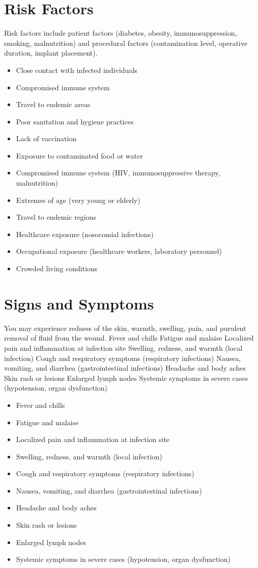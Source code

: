 \section{Risk Factors}
Risk factors include patient factors (diabetes, obesity, immunosuppression, smoking, malnutrition) and procedural factors (contamination level, operative duration, implant placement).

\begin{itemize}[noitemsep]
  \item Close contact with infected individuals
  \item Compromised immune system
  \item Travel to endemic areas
  \item Poor sanitation and hygiene practices
  \item Lack of vaccination
  \item Exposure to contaminated food or water
  \item Compromised immune system (HIV, immunosuppressive therapy, malnutrition)
  \item Extremes of age (very young or elderly)
  \item Travel to endemic regions
  \item Healthcare exposure (nosocomial infections)
  \item Occupational exposure (healthcare workers, laboratory personnel)
  \item Crowded living conditions
\end{itemize}
\section{Signs and Symptoms}
You may experience redness of the skin, warmth, swelling, pain, and purulent removal of fluid from the wound. Fever and chills Fatigue and malaise Localized pain and inflammation at infection site Swelling, redness, and warmth (local infection) Cough and respiratory symptoms (respiratory infections) Nausea, vomiting, and diarrhea (gastrointestinal infections) Headache and body aches Skin rash or lesions Enlarged lymph nodes Systemic symptoms in severe cases (hypotension, organ dysfunction)

\begin{itemize}[noitemsep]
  \item Fever and chills
  \item Fatigue and malaise
  \item Localized pain and inflammation at infection site
  \item Swelling, redness, and warmth (local infection)
  \item Cough and respiratory symptoms (respiratory infections)
  \item Nausea, vomiting, and diarrhea (gastrointestinal infections)
  \item Headache and body aches
  \item Skin rash or lesions
  \item Enlarged lymph nodes
  \item Systemic symptoms in severe cases (hypotension, organ dysfunction)
\end{itemize}
